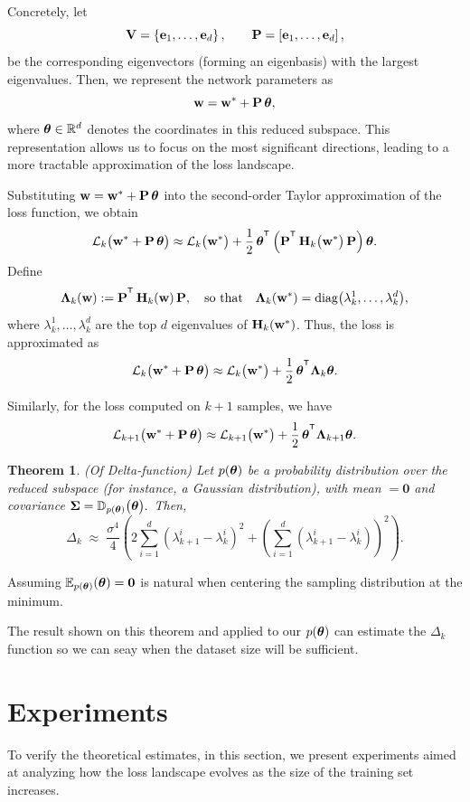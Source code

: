 \documentclass{article}
\newtheorem{theorem}{Theorem} %
\begin{document}
Concretely, let
$$\mathbf{V} = \left\{ \mathbf{e}_1, \dots, \mathbf{e}_d \right\}, \qquad \mathbf{P} = \left[ \mathbf{e}_1, \dots, \mathbf{e}_d \right],$$
be the corresponding eigenvectors (forming an eigenbasis) with the largest eigenvalues. Then, we represent the network parameters as
$$\mathbf{w} = \mathbf{w}^* + \mathbf{P}\,\boldsymbol{\theta},$$ where $\boldsymbol{\theta} \in \mathbb{R}^d$ denotes the coordinates in this reduced subspace. This representation
allows us to focus on the most significant directions, leading to a more tractable approximation of the loss landscape.

Substituting $\mathbf{w} = \mathbf{w}^* + \mathbf{P}\,\boldsymbol{\theta}$ into the second-order Taylor approximation of the loss function, we obtain
$$\cL_k\bigl(\bw^* + \bP\,\btheta\bigr) \approx \cL_k\bigl(\bw^*\bigr) + \frac{1}{2}\,\btheta^{\T} \left( \bP^{\T}\,
  \bH_k\bigl(\bw^*\bigr)\,\bP \right) \btheta.$$
Define
$$\bLambda_k(\bw) := \bP^{\T}\,\bH_k(\bw)\,\bP, \quad \text{so that} \quad \bLambda_k(\bw^*) =
  \operatorname{diag}\bigl(\lambda_k^1,\dots,\lambda_k^d\bigr),$$
where $\lambda_k^1, \dots, \lambda_k^d$ are the top $d$ eigenvalues of $\mathbf{H}_k(\mathbf{w}^*)$. Thus, the loss is approximated as
$$\cL_k\bigl(\bw^* + \bP\,\btheta\bigr) \approx \cL_k\bigl(\bw^*\bigr) + \frac{1}{2}\,\btheta^{\T} \bLambda_k \btheta.$$

Similarly, for the loss computed on $k+1$ samples, we have
$$\cL_{k+1}\bigl(\bw^* + \bP\,\btheta\bigr) \approx \cL_{k+1}\bigl(\bw^*\bigr) + \frac{1}{2}\,\btheta^{\T} \bLambda_{k+1} \btheta.$$

\begin{theorem}
  (Of Delta-function) Let $p(\boldsymbol{\theta})$ be a probability distribution over the reduced subspace (for instance, a Gaussian distribution), with mean
  $\bm = \mathbf{0}$ and covariance $\boldsymbol{\Sigma} = \mathbb{D}_{p(\boldsymbol{\theta})}\bigl(\boldsymbol{\theta}\bigr).$ Then,
  $$\Delta_k \;\approx\; \frac{\sigma^4}{4} \left( 2 \sum_{i=1}^{d}\left( \lambda_{k+1}^i - \lambda_{k}^i \right)^2 + \left(
      \sum_{i=1}^{d}\left( \lambda_{k+1}^i - \lambda_{k}^i \right) \right)^2 \right).$$
\end{theorem}

Assuming $\mathbb{E}_{p(\boldsymbol{\theta})}(\boldsymbol{\theta}) = \mathbf{0}$ is natural when centering the sampling distribution at the minimum.

The result shown on this theorem and applied to our $p(\boldsymbol{\theta})$ can estimate the $\Delta_k$ function so we can seay when the dataset
size will be sufficient.

\section{Experiments}
To verify the theoretical estimates, in this section, we present experiments aimed at analyzing how the loss landscape evolves as
the size of the training set increases.
\end{document}
